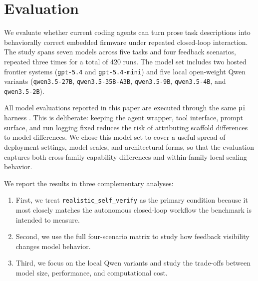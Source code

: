 \documentclass[a4paper,fleqn]{cas-dc}
\DeclareRobustCommand{\tool}[1]{\texttt{\nolinkurl{#1}}}
\begin{document}
\section{Evaluation}
\label{sec:evaluation}

We evaluate whether current coding agents can turn prose task descriptions into behaviorally correct embedded firmware under repeated closed-loop interaction. The study spans seven models across five tasks and four feedback scenarios, repeated three times for a total of 420 runs. The model set includes two hosted frontier systems (\tool{gpt-5.4} and \tool{gpt-5.4-mini}) and five local open-weight Qwen variants (\tool{qwen3.5-27B}, \tool{qwen3.5-35B-A3B}, \tool{qwen3.5-9B}, \tool{qwen3.5-4B}, and \tool{qwen3.5-2B}).

All model evaluations reported in this paper are executed through the same \tool{pi} harness \cite{pi_mono_coding_agent}. This is deliberate: keeping the agent wrapper, tool interface, prompt surface, and run logging fixed reduces the risk of attributing scaffold differences to model differences. We chose this model set to cover a useful spread of deployment settings, model scales, and architectural forms, so that the evaluation captures both cross-family capability differences and within-family local scaling behavior.

We report the results in three complementary analyses:

\begin{enumerate}
    \item First, we treat \tool{realistic_self_verify} as the primary condition because it most closely matches the autonomous closed-loop workflow the benchmark is intended to measure.
    \item Second, we use the full four-scenario matrix to study how feedback visibility changes model behavior.
    \item Third, we focus on the local Qwen variants and study the trade-offs between model size, performance, and computational cost.
\end{enumerate}
\end{document}
